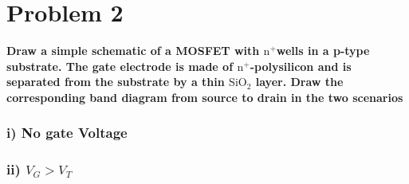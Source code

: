 \section{Problem 2}
\textbf{Draw a simple schematic of a MOSFET with $\mathrm{n}^{+}$wells in a p-type substrate. The gate electrode is made of $\mathrm{n}^{+}$-polysilicon and is separated from the substrate by a thin $\mathrm{SiO}_2$ layer. Draw the corresponding band diagram from source to drain in the two scenarios}
\subsubsection*{i) No gate Voltage}
\subsubsection*{ii) $V_G>V_T$}
